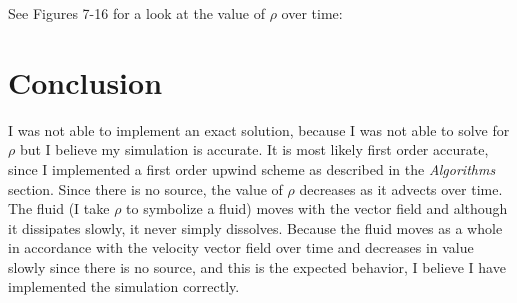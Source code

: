 \documentclass[12pt]{article}
\begin{document}
See Figures 7-16 for a look at the value of $\rho$ over time:



\section{Conclusion}\label{sec::conclusion}
I was not able to implement an exact solution, because I was not able to solve for $\rho$ but I believe my simulation is accurate. It is most likely first order accurate, since I implemented a first order upwind scheme as described in the \emph{Algorithms} section. Since there is no source, the value of $\rho$ decreases as it advects over time. The fluid (I take $\rho$ to symbolize a fluid) moves with the vector field and although it dissipates slowly, it never simply dissolves. Because the fluid moves as a whole in accordance with the velocity vector field over time and decreases in value slowly since there is no source, and this is the expected behavior, I believe I have implemented the simulation correctly.
\end{document}
